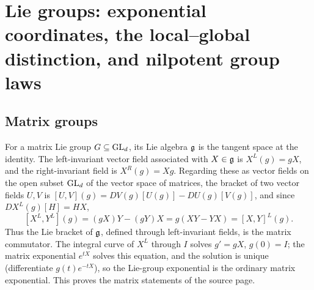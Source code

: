 \section{Lie groups: exponential coordinates, the local--global distinction, and nilpotent group laws}\label{sec:liegroups}
\subsection{Matrix groups}
For a matrix Lie group $G\subseteq\operatorname{GL}_d$, its Lie algebra $\mathfrak{g}$ is the
tangent space at the identity. The left-invariant vector field associated
with $X\in\mathfrak{g}$ is $X^L(g)=gX$, and the right-invariant field is $X^R(g)=Xg$. Regarding these as vector fields on the open
subset $\operatorname{GL}_d$ of the vector space of matrices, the bracket of two vector
fields $U,V$ is $[U,V](g)=DV(g)[U(g)]-DU(g)[V(g)]$, and since
$DX^L(g)[H]=HX$,
\[
 [X^L,Y^L](g)=(gX)Y-(gY)X=g(XY-YX)=[X,Y]^L(g).
\]
Thus the Lie bracket of $\mathfrak{g}$, defined through left-invariant fields, is the
matrix commutator. The integral curve of $X^L$ through $I$ solves
$g'=gX$, $g(0)=I$; the matrix exponential $e^{tX}$ solves this equation, and
the solution is unique (differentiate $g(t)e^{-tX}$), so the Lie-group
exponential is the ordinary matrix exponential. This proves the matrix
statements of the source page.

